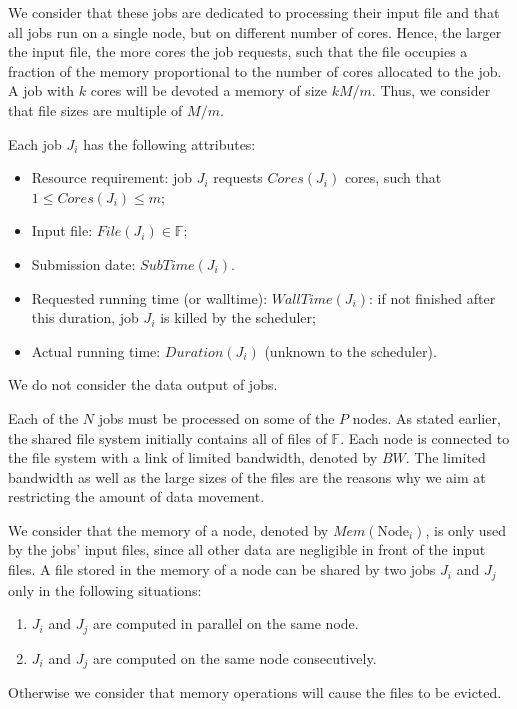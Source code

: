 \documentclass[conference,10pt]{IEEEtran}
\newcommand{\Node}[1]{\ensuremath{\mathrm{Node}_{#1}}\xspace}
\newcommand{\file}{\ensuremath{\mathit{File}}\xspace}
\newcommand{\memory}{\ensuremath{\mathit{Mem}}\xspace}
\newcommand{\duration}{\mathit{Duration}\xspace}
\newcommand{\bandwidth}{\mathit{BW}\xspace}
\newcommand{\core}{\mathit{Cores}\xspace}
\newcommand{\submissiontime}{\mathit{SubTime}\xspace}
\newcommand{\walltime}{\mathit{WallTime}\xspace}
\newcommand{\fileset}{\ensuremath{\mathbb{F}}\xspace}
\begin{document}

We consider that these jobs are dedicated to processing their input
file and that all jobs run on a single node, but on different number
of cores. Hence, the larger the input file, the more cores the job
requests, such that the file occupies a fraction of the memory
proportional to the number of cores allocated to the job. A job with
$k$ cores will be devoted a memory of size $k M/m$. Thus, we consider
that file sizes are multiple of $M/m$.  


Each job $J_i$ has the following attributes:
\begin{itemize}
\item Resource requirement: job $J_i$ requests $\core(J_i)$  cores, such that $1 \leq \core(J_i) \leq m$;
\item Input file: $\file(J_i) \in \fileset$;
\item Submission date: $\submissiontime(J_i)$.
\item Requested running time (or walltime): $\walltime(J_i)$: if not
  finished after this duration, job $J_i$ is killed by the scheduler;
\item Actual running time: $\duration(J_i)$ (unknown to  the scheduler).
\end{itemize}

We do not consider the data output of jobs.

Each of the $N$ jobs must be processed on some of the $P$ nodes.  As
stated earlier, the shared file system initially contains all of files
of $\fileset$.  Each node is connected to the file system with a link
of limited bandwidth, denoted by $\bandwidth$.  The limited bandwidth
as well as the large sizes of the files are the reasons why we aim at
restricting the amount of data movement.

We consider that the memory of a node, denoted by $\memory(\Node{i})$,
is only used by the jobs' input files, since all other data are
negligible in front of the input files.
A file stored in the memory of a node can be shared by two jobs $J_i$ and $J_j$ only in the following situations:
\begin{enumerate}
	\item $J_i$ and $J_j$ are computed in parallel on the same node.
	\item $J_i$ and $J_j$ are computed on the same node consecutively.
\end{enumerate}
Otherwise we consider that memory operations will cause the files to
be evicted.  
\end{document}
